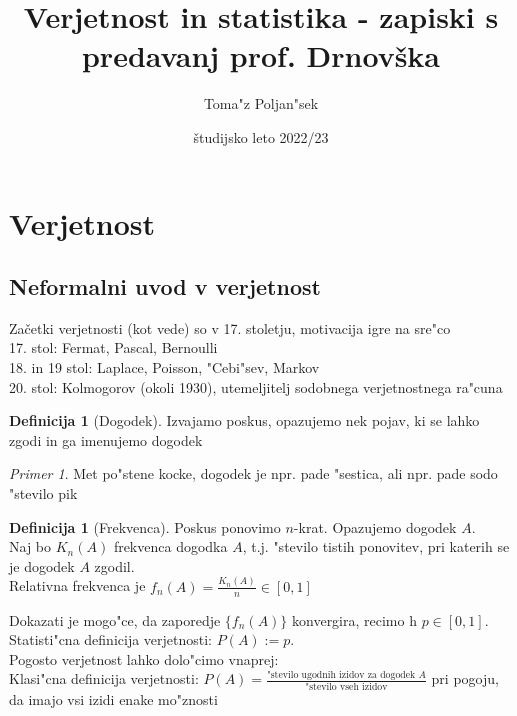 \documentclass[a4paper,12pt]{article}
\theoremstyle{definition}
\newtheorem{defn}[counter]{Definicija}
\theoremstyle{remark}
\newtheorem*{ex}{Primer}
\begin{document}
\title{Verjetnost in statistika - zapiski s predavanj prof. Drnovška}
\author{
	Toma"z Poljan"sek
}
\date{študijsko leto 2022/23}
\maketitle


\tableofcontents
\newpage
{}




\section{Verjetnost}

\subsection{Neformalni uvod v verjetnost}

Začetki verjetnosti (kot vede) so v 17. stoletju, motivacija igre na sre"co \\
17. stol: Fermat, Pascal, Bernoulli \\
18. in 19 stol: Laplace, Poisson, "Cebi"sev, Markov \\
20. stol: Kolmogorov (okoli 1930), utemeljitelj sodobnega verjetnostnega ra"cuna \\

\begin{defn}[Dogodek]
    Izvajamo poskus, opazujemo nek pojav, ki se lahko zgodi in ga imenujemo dogodek
\end{defn}

\begin{ex}
    Met po"stene kocke, dogodek je npr. pade "sestica, ali npr. pade sodo "stevilo pik
\end{ex}

\begin{defn}[Frekvenca]
    Poskus ponovimo $n$-krat. Opazujemo dogodek $A$. \\
    Naj bo $K_n(A)$ frekvenca dogodka $A$, t.j. "stevilo tistih ponovitev, pri katerih se je dogodek $A$ zgodil. \\
    Relativna frekvenca je $f_n(A) = \frac{K_n(A)}{n} \in [0,1]$
\end{defn}

Dokazati je mogo"ce, da zaporedje $\{f_n(A)\}$ konvergira, recimo h $p \in [0,1]$. \\
Statisti"cna definicija verjetnosti: $P(A) := p$. \\
Pogosto verjetnost lahko dolo"cimo vnaprej: \\
Klasi"cna definicija verjetnosti: $P(A) = \frac{\text{"stevilo ugodnih izidov za dogodek }A}{\text{"stevilo vseh izidov}}$
pri pogoju, da imajo vsi izidi enake mo"znosti
\end{document}
